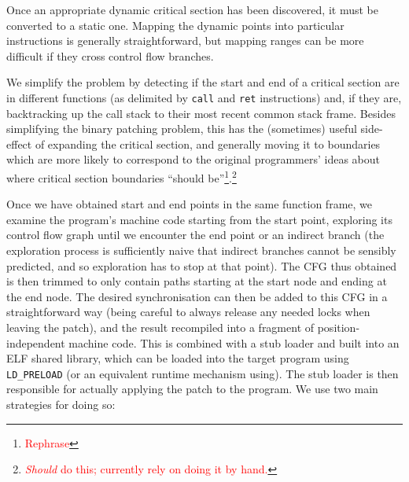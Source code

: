 \documentclass[10pt,twocolumn,preprint,natbib,authoryear]{sigplanconf}
\newcommand{\editorial}[1]{\textcolor{red}{\footnote{\textcolor{red}{#1}}}}
\begin{document}
Once an appropriate dynamic critical section has been discovered, it
must be converted to a static one.  Mapping the dynamic points into
particular instructions is generally straightforward, but mapping
ranges can be more difficult if they cross control flow branches.

We simplify the problem by detecting if the start and end of a
critical section are in different functions (as delimited by
\verb|call| and \verb|ret| instructions) and, if they are,
backtracking up the call stack to their most recent common stack
frame.  Besides simplifying the binary patching problem, this has the
(sometimes) useful side-effect of expanding the critical section, and
generally moving it to boundaries which are more likely to correspond
to the original programmers' ideas about where critical section
boundaries ``should be''\editorial{Rephrase}.\editorial{\emph{Should}
  do this; currently rely on doing it by hand.}

Once we have obtained start and end points in the same function frame,
we examine the program's machine code starting from the start point,
exploring its control flow graph until we encounter the end point or
an indirect branch (the exploration process is sufficiently naive that
indirect branches cannot be sensibly predicted, and so exploration has
to stop at that point).  The CFG thus obtained is then trimmed to only
contain paths starting at the start node and ending at the end node.
The desired synchronisation can then be added to this CFG in a
straightforward way (being careful to always release any needed locks
when leaving the patch), and the result recompiled into a fragment of
position-independent machine code.  This is combined with a stub
loader and built into an ELF shared library, which can be loaded into
the target program using \verb|LD_PRELOAD| (or an equivalent runtime
mechanism using).  The stub loader is then responsible for actually
applying the patch to the program.  We use two main strategies for
doing so:
\end{document}
